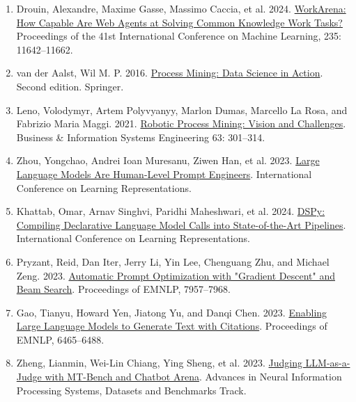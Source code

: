 \documentclass[11pt]{article}
\begin{document}
\begin{enumerate}
\item Drouin, Alexandre, Maxime Gasse, Massimo Caccia, et al. 2024. \href{https://proceedings.mlr.press/v235/drouin24a.html}{WorkArena: How Capable Are Web Agents at Solving Common Knowledge Work Tasks?} Proceedings of the 41st International Conference on Machine Learning, 235: 11642--11662.
\item van der Aalst, Wil M. P. 2016. \href{https://doi.org/10.1007/978-3-662-49851-4}{Process Mining: Data Science in Action}. Second edition. Springer.
\item Leno, Volodymyr, Artem Polyvyanyy, Marlon Dumas, Marcello La Rosa, and Fabrizio Maria Maggi. 2021. \href{https://doi.org/10.1007/s12599-020-00641-4}{Robotic Process Mining: Vision and Challenges}. Business \& Information Systems Engineering 63: 301--314.
\item Zhou, Yongchao, Andrei Ioan Muresanu, Ziwen Han, et al. 2023. \href{https://arxiv.org/abs/2211.01910}{Large Language Models Are Human-Level Prompt Engineers}. International Conference on Learning Representations.
\item Khattab, Omar, Arnav Singhvi, Paridhi Maheshwari, et al. 2024. \href{https://proceedings.iclr.cc/paper_files/paper/2024/hash/f1cf02ce09757f57c3b93c0db83181e0-Abstract-Conference.html}{DSPy: Compiling Declarative Language Model Calls into State-of-the-Art Pipelines}. International Conference on Learning Representations.
\item Pryzant, Reid, Dan Iter, Jerry Li, Yin Lee, Chenguang Zhu, and Michael Zeng. 2023. \href{https://doi.org/10.18653/v1/2023.emnlp-main.494}{Automatic Prompt Optimization with "Gradient Descent" and Beam Search}. Proceedings of EMNLP, 7957--7968.
\item Gao, Tianyu, Howard Yen, Jiatong Yu, and Danqi Chen. 2023. \href{https://doi.org/10.18653/v1/2023.emnlp-main.398}{Enabling Large Language Models to Generate Text with Citations}. Proceedings of EMNLP, 6465--6488.
\item Zheng, Lianmin, Wei-Lin Chiang, Ying Sheng, et al. 2023. \href{https://arxiv.org/abs/2306.05685}{Judging LLM-as-a-Judge with MT-Bench and Chatbot Arena}. Advances in Neural Information Processing Systems, Datasets and Benchmarks Track.
\end{enumerate}
\end{document}
